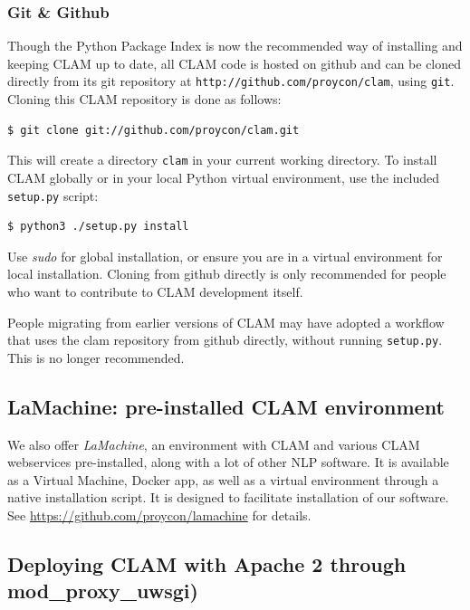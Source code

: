 \documentclass[a4paper,12pt,twoside,openright]{report}
\begin{document}
\subsubsection{Git \& Github}

Though the Python Package Index is now the recommended way of installing and
keeping CLAM up to date, all CLAM code is hosted on github and can be
cloned directly from its git repository at
\texttt{http://github.com/proycon/clam}, using \texttt{git}. Cloning this CLAM
repository is done as follows:

{ \small
\begin{verbatim}
$ git clone git://github.com/proycon/clam.git
\end{verbatim}
}
 
This will create a directory \texttt{clam} in your current working directory.
To install CLAM globally or in your local Python virtual environment, use the
included \texttt{setup.py} script:

{ \small
\begin{verbatim}
$ python3 ./setup.py install
\end{verbatim}
}

Use \emph{sudo} for global installation, or ensure you are in a virtual
environment for local installation. Cloning from github directly is only
recommended for people who want to contribute to CLAM development itself.

People migrating from earlier versions of CLAM may have adopted a
workflow that uses the clam repository from github directly, without running
\texttt{setup.py}. This is no longer recommended.

\subsection{LaMachine: pre-installed CLAM environment}

We also offer \emph{LaMachine}, an environment with CLAM and various CLAM
webservices pre-installed, along with a lot of other NLP software. It is available
as a Virtual Machine, Docker app, as well as a virtual environment through a
native installation script. It is designed to facilitate installation of our
software. See \url{https://github.com/proycon/lamachine} for
details. 

\subsection{Deploying CLAM with Apache 2 through mod\_proxy\_uwsgi)}
\label{sec:uwsgi}
\end{document}
